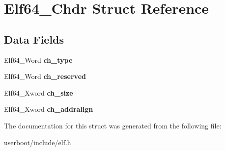 \hypertarget{structElf64__Chdr}{}\section{Elf64\+\_\+\+Chdr Struct Reference}
\label{structElf64__Chdr}
\subsection*{Data Fields}
\begin{DoxyCompactItemize}
\item 
Elf64\+\_\+\+Word {\bfseries ch\+\_\+type}\hypertarget{structElf64__Chdr_a2c223162cc65a21d7827e9218a441550}{}\label{structElf64__Chdr_a2c223162cc65a21d7827e9218a441550}

\item 
Elf64\+\_\+\+Word {\bfseries ch\+\_\+reserved}\hypertarget{structElf64__Chdr_a60439447207fd3d24c2254547947ab0f}{}\label{structElf64__Chdr_a60439447207fd3d24c2254547947ab0f}

\item 
Elf64\+\_\+\+Xword {\bfseries ch\+\_\+size}\hypertarget{structElf64__Chdr_ab3f1fb2625aec2f565bd508b0b8062e3}{}\label{structElf64__Chdr_ab3f1fb2625aec2f565bd508b0b8062e3}

\item 
Elf64\+\_\+\+Xword {\bfseries ch\+\_\+addralign}\hypertarget{structElf64__Chdr_a509098e81e05dc00688c2739a7836ed9}{}\label{structElf64__Chdr_a509098e81e05dc00688c2739a7836ed9}

\end{DoxyCompactItemize}


The documentation for this struct was generated from the following file\+:\begin{DoxyCompactItemize}
\item 
userboot/include/elf.\+h\end{DoxyCompactItemize}

